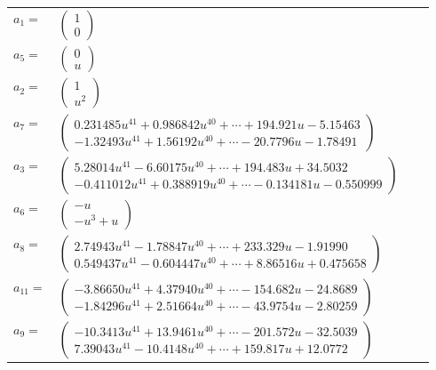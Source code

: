\documentclass[1p]{elsarticle_modified}
\theoremstyle{definition}
\begin{document}
\begin{tabular}{m{7pt} m{180pt} m{7pt} m{180pt} }
\flushright $a_{1}=$&$\begin{pmatrix}1\\0\end{pmatrix}$ \\
\flushright $a_{5}=$&$\begin{pmatrix}0\\u\end{pmatrix}$ \\
\flushright $a_{2}=$&$\begin{pmatrix}1\\u^2\end{pmatrix}$ \\
\flushright $a_{7}=$&$\begin{pmatrix}0.231485 u^{41}+0.986842 u^{40}+\cdots+194.921 u-5.15463\\-1.32493 u^{41}+1.56192 u^{40}+\cdots-20.7796 u-1.78491\end{pmatrix}$ \\
\flushright $a_{3}=$&$\begin{pmatrix}5.28014 u^{41}-6.60175 u^{40}+\cdots+194.483 u+34.5032\\-0.411012 u^{41}+0.388919 u^{40}+\cdots-0.134181 u-0.550999\end{pmatrix}$ \\
\flushright $a_{6}=$&$\begin{pmatrix}- u\\- u^3+u\end{pmatrix}$ \\
\flushright $a_{8}=$&$\begin{pmatrix}2.74943 u^{41}-1.78847 u^{40}+\cdots+233.329 u-1.91990\\0.549437 u^{41}-0.604447 u^{40}+\cdots+8.86516 u+0.475658\end{pmatrix}$ \\
\flushright $a_{11}=$&$\begin{pmatrix}-3.86650 u^{41}+4.37940 u^{40}+\cdots-154.682 u-24.8689\\-1.84296 u^{41}+2.51664 u^{40}+\cdots-43.9754 u-2.80259\end{pmatrix}$ \\
\flushright $a_{9}=$&$\begin{pmatrix}-10.3413 u^{41}+13.9461 u^{40}+\cdots-201.572 u-32.5039\\7.39043 u^{41}-10.4148 u^{40}+\cdots+159.817 u+12.0772\end{pmatrix}$ \\

\end{tabular}
\end{document}
